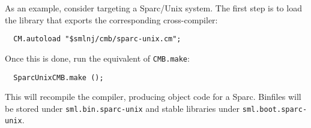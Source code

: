 As an example, consider targeting a Sparc/Unix system.  The first step
is to load the library that exports the corresponding cross-compiler:

\begin{verbatim}
  CM.autoload "$smlnj/cmb/sparc-unix.cm";
\end{verbatim}

Once this is done, run the equivalent of {\tt CMB.make}:

\begin{verbatim}
  SparcUnixCMB.make ();
\end{verbatim}

This will recompile the compiler, producing object code for a Sparc.
Binfiles will be stored under {\tt sml.bin.sparc-unix} and stable
libraries under {\tt sml.boot.sparc-unix}.
